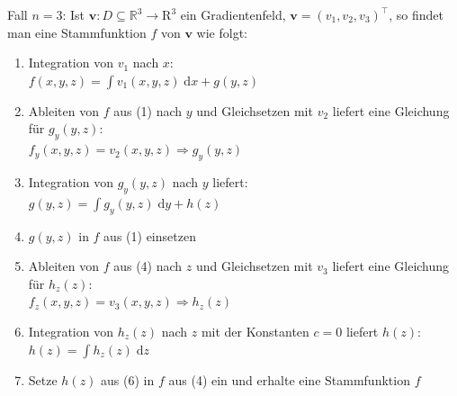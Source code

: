 \documentclass[6pt,a4paper]{scrartcl}
\renewcommand{\vec}[1]{\ensuremath{\boldsymbol {#1}}}											%
\newcommand{\diff}{\ensuremath{\;\mathrm d}}									%
\begin{document}
\begin{multicols*}{4}

Fall $n=3$: Ist $\vec v:D\subseteq \mathbb{R}^3\rightarrow\mathrm{R}^3$ ein Gradientenfeld, $\vec v=(v_1,v_2,v_3)^\top$, so findet man eine Stammfunktion $f$ von $\vec v$ wie folgt:
\begin{enumerate}
	\item Integration von $v_1$ nach $x$:\\
	$f(x,y,z)=\int {v_1(x,y,z)\diff x} + g(y,z)$
	\item Ableiten von $f$ aus (1) nach $y$ und Gleichsetzen mit $v_2$ liefert eine Gleichung für $g_y(y,z)$:\\
	$f_y(x,y,z)=v_2(x,y,z) \Rightarrow g_y(y,z)$
	\item Integration von $g_y(y,z)$ nach $y$ liefert:\\
	$g(y,z) = \int{g_y(y,z)\diff y} + h(z)$
	\item $g(y,z)$ in $f$ aus (1) einsetzen
	\item Ableiten von $f$ aus (4) nach $z$ und Gleichsetzen mit $v_3$ liefert eine Gleichung für $h_z(z)$:\\
	$f_z(x,y,z)=v_3(x,y,z) \Rightarrow h_z(z)$
	\item Integration von $h_z(z)$ nach $z$ mit der Konstanten $c=0$ liefert $h(z)$: \\
	$h(z)=\int{h_z(z)\diff z}$
	\item Setze $h(z)$ aus (6) in $f$ aus (4) ein und erhalte eine Stammfunktion $f$
\end{enumerate}


\end{multicols*}
\end{document}
